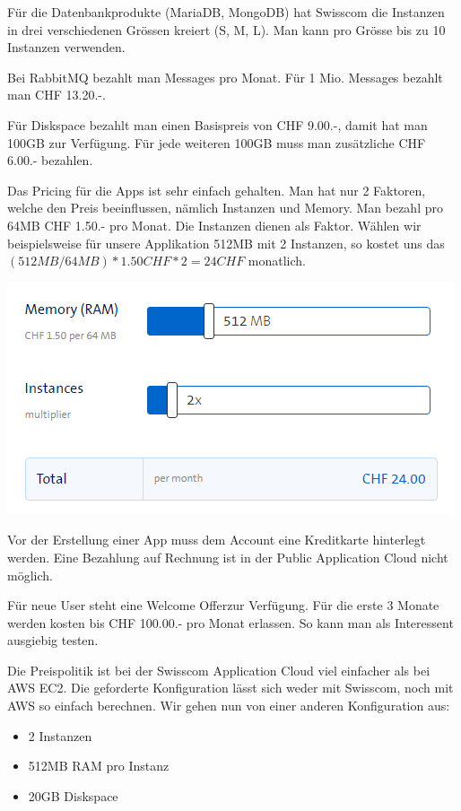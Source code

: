 Für die Datenbankprodukte (MariaDB, MongoDB) hat Swisscom die Instanzen in drei verschiedenen Grössen kreiert (S, M, L). Man kann pro Grösse bis zu 10 Instanzen verwenden. 

Bei RabbitMQ bezahlt man Messages pro Monat. Für 1 Mio. Messages bezahlt man CHF 13.20.-. 

Für Diskspace bezahlt man einen Basispreis von CHF 9.00.-, damit hat man 100GB zur Verfügung. Für jede weiteren 100GB muss man zusätzliche CHF 6.00.- bezahlen.

Das Pricing für die Apps ist sehr einfach gehalten. Man hat nur 2 Faktoren, welche den Preis beeinflussen, nämlich Instanzen und Memory. Man bezahl pro 64MB CHF 1.50.- pro Monat. Die Instanzen dienen als Faktor. Wählen wir beispielsweise für unsere Applikation 512MB mit 2 Instanzen, so kostet uns das \((512MB/64MB)*1.50CHF*2=24CHF\) monatlich.

\includegraphics[scale=0.8]{images/price-per-month.png}

Vor der Erstellung einer App muss dem Account eine Kreditkarte hinterlegt werden. Eine Bezahlung auf Rechnung ist in der Public Application Cloud nicht möglich.

Für neue User steht eine \glqq Welcome Offer\grqq zur Verfügung. Für die erste 3 Monate werden kosten bis CHF 100.00.- pro Monat erlassen. So kann man als Interessent ausgiebig testen. 

Die Preispolitik ist bei der Swisscom Application Cloud viel einfacher als bei AWS EC2. Die geforderte Konfiguration lässt sich weder mit Swisscom, noch mit AWS so einfach berechnen. Wir gehen nun von einer anderen Konfiguration aus:
\begin{itemize}
\item 2 Instanzen
\item 512MB RAM pro Instanz
\item 20GB Diskspace
\end{itemize}

